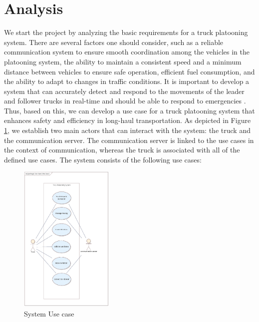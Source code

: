 \section{Analysis}
\label{sec:analysis}
We start the project by analyzing the basic requirements for a truck platooning system. There are several factors one should consider, such as a reliable communication system to ensure smooth coordination among the vehicles in the platooning system, the ability to maintain a consistent speed and a minimum distance between vehicles to ensure safe operation, efficient fuel consumption, and the ability to adapt to changes in traffic conditions. It is important to develop a system that can accurately detect and respond to the movements of the leader and follower trucks in real-time and should be able to respond to emergencies \cite{b2}.\\
Thus, based on this, we can develop a use case for a truck platooning system that enhances safety and efficiency in long-haul transportation. As depicted in Figure \ref{img:usecase}, we establish two main actors that can interact with the system: the truck and the communication server. The communication server is linked to the use cases in the context of communication, whereas the truck is associated with all of the defined use cases. The system consists of the following use cases:
\begin{figure}[ht]
    \centering
    \includegraphics[width=0.4\textwidth]{images/usecase.png}
    \caption{System Use case}
    \label{img:usecase}
\end{figure}

